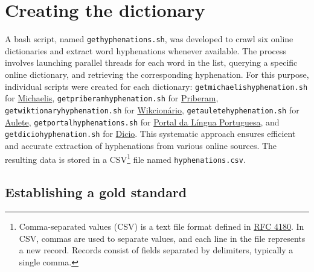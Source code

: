 \section{Creating the dictionary}\label{sec-dictionay}

A bash script, named \texttt{gethyphenations.sh}, was developed to crawl six
online dictionaries and extract word hyphenations whenever available. The
process involves launching parallel threads for each word in the list, querying
a specific online dictionary, and retrieving the corresponding hyphenation. For
this purpose, individual scripts were created for each dictionary:
\texttt{getmichaelishyphenation.sh} for \href{https://michaelis.uol.com.br/}{Michaelis},
\texttt{getpriberamhyphenation.sh} for \href{https://dicionario.priberam.org/}{Priberam},
\texttt{getwiktionaryhyphenation.sh} for \href{https://pt.wiktionary.org}{Wikcionário},
\texttt{getauletehyphenation.sh} for \href{https://aulete.com.br/}{Aulete},
\texttt{getportalhyphenations.sh} for \href{http://www.portaldalinguaportuguesa.org/}{Portal da Língua Portuguesa}, and
\texttt{getdiciohyphenation.sh} for \href{https://www.dicio.com.br/}{Dicio}.
This systematic approach ensures efficient and accurate extraction of
hyphenations from various online sources. The resulting data is stored in a CSV\footnote{
    Comma-separated values (CSV) is a text file format defined in \href{https://datatracker.ietf.org/doc/html/rfc4180}{RFC 4180}.
    In CSV, commas are used to separate values, and each line in the file represents a new record. Records consist of fields separated by delimiters, typically a single comma.
} file named \texttt{hyphenations.csv}.






\subsection{Establishing a gold standard}

